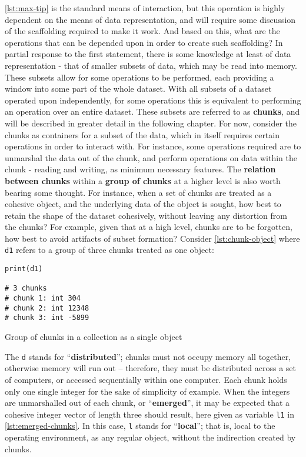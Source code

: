 \ref{lst:max-tip} is the standard means of interaction, but this operation is highly
dependent on the means of data representation, and will require some
discussion of the scaffolding required to make it work. And based on
this, what are the operations that can be depended upon in order to
create such scaffolding? In partial response to the first statement,
there is some knowledge at least of data representation - that of
smaller subsets of data, which may be read into memory. These subsets
allow for some operations to be performed, each providing a window into
some part of the whole dataset. With all subsets of a dataset operated
upon independently, for some operations this is equivalent to performing
an operation over an entire dataset. These subsets are referred to as
\textbf{chunks}, and will be described in greater detail in the
following chapter. For now, consider the chunks as containers for a
subset of the data, which in itself requires certain operations in order
to interact with. For instance, some operations required are to
unmarshal the data out of the chunk, and perform operations on data
within the chunk - reading and writing, as minimum necessary features.
The \textbf{relation between chunks} within a \textbf{group of chunks}
at a higher level is also worth bearing some thought. For instance, when
a set of chunks are treated as a cohesive object, and the underlying
data of the object is sought, how best to retain the shape of the
dataset cohesively, without leaving any distortion from the chunks? For
example, given that at a high level, chunks are to be forgotten, how
best to avoid artifacts of subset formation? Consider \ref{lst:chunk-object}
where \texttt{d1} refers to a group of three chunks treated as one
object:

\begin{listing}
    \begin{verbatim}
print(d1)

# 3 chunks
# chunk 1: int 304
# chunk 2: int 12348
# chunk 3: int -5899
\end{verbatim}
    \caption{Group of chunks in a collection as a single object}
    \label{lst:chunk-object}
\end{listing}

The \texttt{d} stands for ``\textbf{distributed}''; chunks must not
occupy memory all together, otherwise memory will run out -- therefore,
they must be distributed across a set of computers, or accessed
sequentially within one computer. Each chunk holds only one single
integer for the sake of simplicity of example. When the integers are
unmarshalled out of each chunk, or ``\textbf{emerged}'', it may be
expected that a cohesive integer vector of length three should result,
here given as variable \texttt{l1} in \ref{lst:emerged-chunks}. In this case, \texttt{l} stands for
``\textbf{local}''; that is, local to the operating environment, as any
regular object, without the indirection created by chunks.

